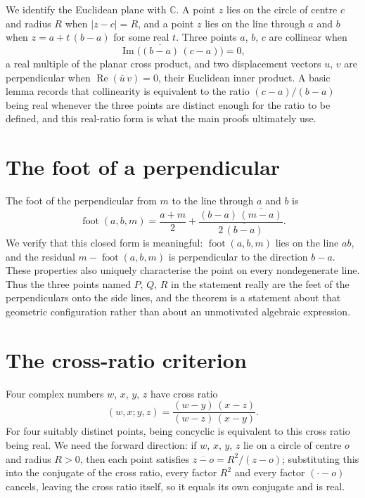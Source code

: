 \documentclass[11pt,a4paper]{article}
\begin{document}
We identify the Euclidean plane with \(\mathbb{C}\).  A point \(z\) lies on the
circle of centre \(c\) and radius \(R\) when \(\lvert z-c\rvert = R\), and a
point \(z\) lies on the line through \(a\) and \(b\) when \(z = a + t\,(b-a)\)
for some real \(t\).  Three points \(a\), \(b\), \(c\) are collinear when
\[
  \operatorname{Im}\bigl(\overline{(b-a)}\,(c-a)\bigr) = 0,
\]
a real multiple of the planar cross product, and two displacement vectors
\(u\), \(v\) are perpendicular when \(\operatorname{Re}(\overline{u}\,v)=0\),
their Euclidean inner product.  A basic lemma records that collinearity is
equivalent to the ratio \((c-a)/(b-a)\) being real whenever the three points are
distinct enough for the ratio to be defined, and this real-ratio form is what
the main proofs ultimately use.

\section{The foot of a perpendicular}

The foot of the perpendicular from \(m\) to the line through \(a\) and \(b\) is
\[
  \operatorname{foot}(a,b,m)
    = \frac{a+m}{2}
      + \frac{(b-a)\,\overline{(m-a)}}{2\,\overline{(b-a)}}.
\]
We verify that this closed form is meaningful: \(\operatorname{foot}(a,b,m)\)
lies on the line \(ab\), and the residual \(m - \operatorname{foot}(a,b,m)\) is
perpendicular to the direction \(b-a\).  These properties also uniquely
characterise the point on every nondegenerate line.  Thus the three points named
\(P\), \(Q\), \(R\) in the statement really are the feet of the perpendiculars
onto the side lines, and the theorem is a statement about that geometric
configuration rather than about an unmotivated algebraic expression.

\section{The cross-ratio criterion}

Four complex numbers \(w\), \(x\), \(y\), \(z\) have cross ratio
\[
  (w,x;y,z) = \frac{(w-y)\,(x-z)}{(w-z)\,(x-y)}.
\]
For four suitably distinct points, being concyclic is equivalent to this cross
ratio being real.  We need the forward direction: if \(w\), \(x\), \(y\), \(z\)
lie on a circle of centre \(o\) and radius \(R>0\), then each point satisfies
\(\overline{z-o} = R^{2}/(z-o)\); substituting this into the conjugate of the
cross ratio, every factor \(R^{2}\) and every factor \((\cdot-o)\) cancels,
leaving the cross ratio itself, so it equals its own conjugate and is real.
\end{document}
